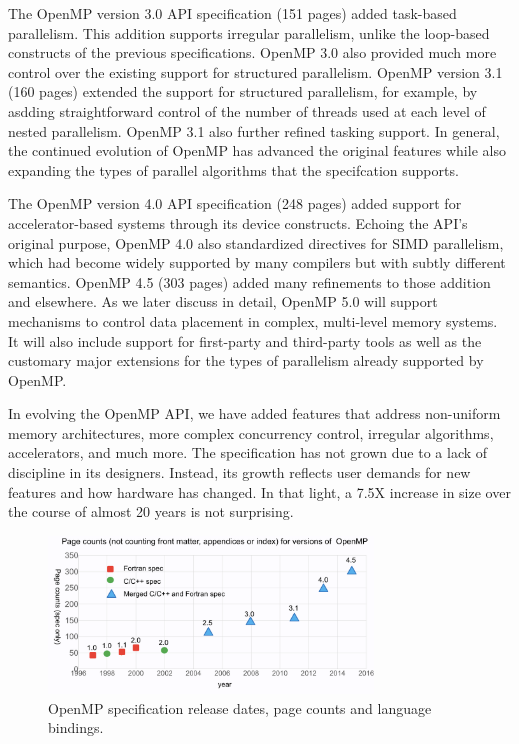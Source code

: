 The OpenMP version 3.0 API specification (151 pages) added task-based 
parallelism. This addition supports irregular parallelism, unlike the 
loop-based constructs of the previous specifications. OpenMP 3.0 also
provided much more control over the existing support for structured
parallelism. OpenMP version 3.1 (160 pages) extended the support for 
structured parallelism, for example, by asdding straightforward control
of the number of threads used at each level of nested parallelism. 
OpenMP 3.1 also further refined tasking support. In general, the 
continued evolution of OpenMP has advanced the original features 
while also expanding the types of parallel algorithms that the 
specifcation supports.

The OpenMP version 4.0 API specification (248 pages) added support for 
accelerator-based systems through its device constructs. Echoing the API's 
original purpose, OpenMP 4.0 also standardized directives for SIMD 
parallelism, which had become widely supported by many compilers but 
with subtly different semantics. OpenMP 4.5 (303 pages) added many 
refinements to those addition and elsewhere. As we later discuss in 
detail, OpenMP 5.0 will support mechanisms to control data placement in
complex, multi-level memory systems. It will also include support for
first-party and third-party tools as well as the customary major 
extensions for the types of parallelism already supported by OpenMP.

In evolving the OpenMP API, we have added features that address 
non-uniform memory architectures, more complex concurrency control, 
irregular algorithms, accelerators, and much more. The specification 
has not grown due to a lack of discipline in its designers. Instead,
its growth reflects user demands for new features and how hardware 
has changed. In that light, a 7.5X increase in size over the course 
of almost 20 years is not surprising.

\begin{figure}
  \centering
  \includegraphics[width=3.4in]{pics/opcounts.png}
  \caption{OpenMP specification release dates, page counts and language bindings.}
  \label{omppcount}
\end{figure}


